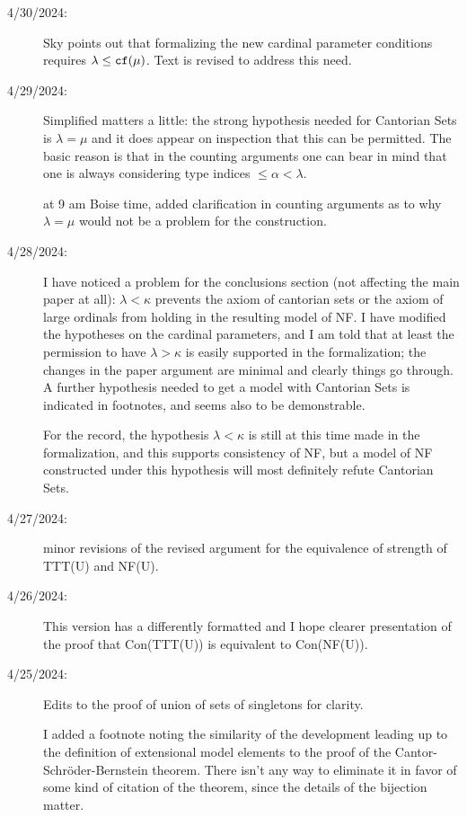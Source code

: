 \documentclass[112pt]{article}
\begin{document}
\begin{description}
\item[4/30/2024:]  Sky points out that formalizing the new cardinal parameter conditions requires $\lambda \leq {\tt cf}(\mu)$.
Text is revised to address this need.

\item[4/29/2024:]  Simplified matters a little:  the strong hypothesis needed for Cantorian Sets is $\lambda=\mu$
and it does appear on inspection that this can be permitted.  The basic reason is that in the counting arguments one can bear in mind that one is always considering type indices $\leq \alpha < \lambda$.

at 9 am Boise time, added clarification in counting arguments as to why $\lambda=\mu$ would not be a problem for the construction.

\item[4/28/2024:]  I have noticed a problem for the conclusions section (not affecting the main paper at all):  $\lambda <\kappa$ prevents the axiom of cantorian sets or the axiom of large ordinals from holding in the resulting model of NF.   I have modified the hypotheses on the cardinal parameters, and I am told that at least the permission to have $\lambda>\kappa$ is easily supported in the formalization;  the changes in the paper argument are minimal and clearly things go through.  A further hypothesis needed to get a model with Cantorian Sets is indicated in footnotes, and seems also to be demonstrable.

For the record, the hypothesis $\lambda < \kappa$ is still at this time made in the formalization, and this supports consistency of NF, but a model of NF constructed under this hypothesis will most definitely refute Cantorian Sets.

\item[4/27/2024:]  minor revisions of the revised argument for the equivalence of strength of TTT(U) and NF(U).

\item[4/26/2024:]  This version has a differently formatted and I hope clearer presentation of the proof that Con(TTT(U)) is equivalent to Con(NF(U)).

\item[4/25/2024:]  Edits to the proof of union of sets of singletons for clarity.

I added a footnote noting the similarity of the development leading up to the definition of
extensional model elements to the proof of the Cantor-Schr\"oder-Bernstein theorem.  There isn't any way to eliminate it in favor of some kind of citation of the theorem, since the details of the bijection matter.


\end{description}
\end{document}
